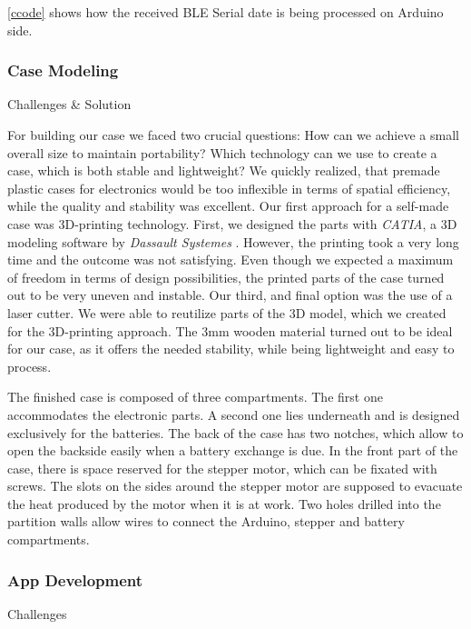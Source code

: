 \documentclass{sigchi}
\begin{document}
\autoref{ccode} shows how the received BLE Serial date is being processed on Arduino side.

 
\subsubsection{Case Modeling}
Challenges \& Solution

For building our case we faced two crucial questions: How can we achieve a small overall size to maintain portability? Which technology can we use to create a case, which is both stable and lightweight? 
We quickly realized, that premade plastic cases for electronics would be too inflexible in terms of spatial efficiency, while the quality and stability was excellent. Our first approach for a self-made case was 3D-printing technology. First, we designed the parts with \textit{CATIA}, a 3D modeling software by \textit{Dassault Systemes} \cite{dassault}. However, the printing took a very long time and the outcome was not satisfying. Even though we expected a maximum of freedom in terms of design possibilities, the printed parts of the case turned out to be very uneven and instable. 
Our third, and final option was the use of a laser cutter. We were able to reutilize parts of the 3D model, which we created for the 3D-printing approach. The 3mm wooden material turned out to be ideal for our case, as it offers the needed stability, while being lightweight and easy to process. 

The finished case is composed of three compartments. The first one accommodates the electronic parts. 
A second one lies underneath and is designed exclusively for the batteries. The back of the case has two notches, which allow to open the backside easily when a battery exchange is due. In the front part of the case, there is space reserved for the stepper motor, which can be fixated with screws. The slots on the sides around the stepper motor are supposed to evacuate the heat produced by the motor when it is at work. Two holes drilled into the partition walls allow wires to connect the Arduino, stepper and battery compartments.


\subsubsection{App Development}
Challenges
\end{document}
